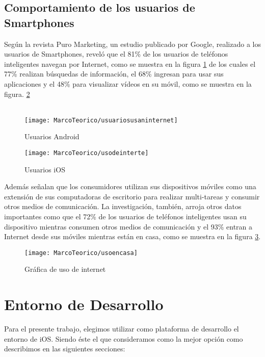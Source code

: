 	\subsection{Comportamiento de los usuarios de Smartphones}
	Según la revista Puro Marketing, un estudio publicado por Google, realizado a los usuarios de Smartphones, reveló que el 81\% de los usuarios de teléfonos inteligentes navegan por Internet,  como se muestra en la figura \ref{fig:grafica1usodeinternet} de los cuales el 77\% realizan búsquedas de información, el 68\% ingresan para usar sus aplicaciones y el 48\% para visualizar vídeos en su móvil, como se muestra en la figura\cite{19}. \ref{fig:grafica2usodeinternet}\\ \\
	\begin{figure}[ht]
		\centering
		\caption{Usuarios Android}
		\label{fig:grafica1usodeinternet}
		\texttt{[image: MarcoTeorico/usuariosusaninternet]}
	\end{figure}
	\begin{figure}[ht]
		\centering
		\caption{Usuarios iOS}
		\label{fig:grafica2usodeinternet}
		\texttt{[image: MarcoTeorico/usodeinterte]}
	\end{figure}
	Además señalan que los consumidores utilizan sus dispositivos móviles como una extensión de sus computadoras de escritorio para realizar multi-tareas y consumir otros medios de comunicación. La investigación, también, arroja otros datos importantes como que el 72\% de los usuarios de teléfonos inteligentes usan su dispositivo mientras consumen otros medios de comunicación y el 93\% entran a Internet desde sus móviles mientras están en casa, como se muestra en la figura  \ref{fig:grafica3usodeinternet}\cite{09}. \\
	\begin{figure}[ht]
		\centering
		\caption{Gráfica de uso de internet}
		\label{fig:grafica3usodeinternet}
		\texttt{[image: MarcoTeorico/usoencasa]}
	\end{figure}
	
	\section{Entorno de Desarrollo}
	
		Para el presente trabajo, elegimos utilizar como plataforma de desarrollo el entorno de iOS. Siendo éste el que consideramos como la mejor opción como describimos en las siguientes secciones:
		
